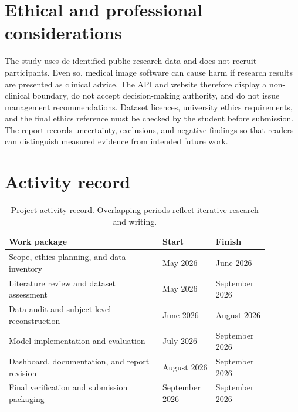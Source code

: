 \documentclass[10pt]{article}
\begin{document}
\section{Ethical and professional considerations}

The study uses de-identified public research data and does not recruit participants. Even so, medical image software can cause harm if research results are presented as clinical advice. The API and website therefore display a non-clinical boundary, do not accept decision-making authority, and do not issue management recommendations. Dataset licences, university ethics requirements, and the final ethics reference must be checked by the student before submission. The report records uncertainty, exclusions, and negative findings so that readers can distinguish measured evidence from intended future work.

\section{Activity record}

\begin{table}[h]
\centering
\small
\begin{tabular}{p{0.52\linewidth}p{0.18\linewidth}p{0.18\linewidth}}
\toprule
\textbf{Work package} & \textbf{Start} & \textbf{Finish} \\
\midrule
Scope, ethics planning, and data inventory & May 2026 & June 2026 \\
Literature review and dataset assessment & May 2026 & September 2026 \\
Data audit and subject-level reconstruction & June 2026 & August 2026 \\
Model implementation and evaluation & July 2026 & September 2026 \\
Dashboard, documentation, and report revision & August 2026 & September 2026 \\
Final verification and submission packaging & September 2026 & September 2026 \\
\bottomrule
\end{tabular}
\caption{Project activity record. Overlapping periods reflect iterative research and writing.}
\end{table}



\end{document}
